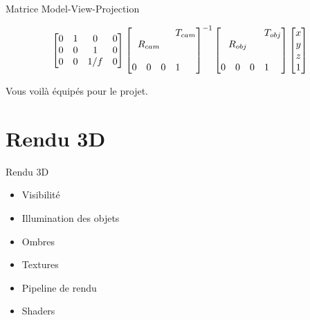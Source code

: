 \documentclass[compress]{beamer}
\def\block(#1,#2)#3{\multicolumn{#2}{c}{\multirow{#1}{*}{$ #3 $}}}
\begin{document}
\begin{frame}{Matrice Model-View-Projection}
\begin{center}
{\[\begin{bmatrix}
                    0 & 1 & 0 & 0  \\
                    0 & 0 & 1 & 0  \\
                    0 & 0 & 1/f & 0
    \end{bmatrix}
    \begin{bmatrix}
        \block(3,3){R_{cam}} & \block(1,3){T_{cam}} \\
                    &  &  &  \\
                    &  &  &  \\
                    0 & 0  & 0 & 1
    \end{bmatrix}^{-1}
    \begin{bmatrix}
        \block(3,3){R_{obj}} & \block(1,3){T_{obj}} \\
                    &  &  &  \\
                    &  &  &  \\
                    0 & 0  & 0 & 1
    \end{bmatrix}
    \begin{bmatrix} x \\ y \\ z \\ 1 \end{bmatrix}
    \]

}
    \end{center}

\end{frame}

\begin{frame}{}
    \begin{center}
    \Large
    Vous voilà équipés pour le projet.
    \end{center}
\end{frame}

\section{Rendu 3D}


\begin{frame}{Rendu 3D}
    \begin{itemize}
        \item Visibilité
        \item Illumination des objets
        \item Ombres
        \item Textures
        \item Pipeline de rendu
        \item Shaders
    \end{itemize}
\end{frame}
\end{document}
